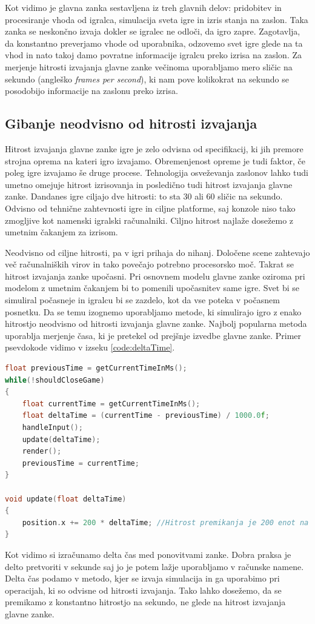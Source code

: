\documentclass[12pt,a4paper,twoside]{book}
\begin{document}
Kot vidimo je glavna zanka sestavljena iz treh glavnih delov: pridobitev in procesiranje vhoda od igralca, simulacija sveta igre in izris stanja na zaslon. Taka zanka se neskončno izvaja dokler se igralec ne odloči, da igro zapre. Zagotavlja, da konstantno preverjamo vhode od uporabnika, odzovemo svet igre glede na ta vhod in nato takoj damo povratne informacije igralcu preko izrisa na zaslon. Za merjenje hitrosti izvajanja glavne zanke večinoma uporabljamo mero sličic na sekundo (angleško \textit{frames per second}), ki nam pove kolikokrat na sekundo se posodobijo informacije na zaslonu preko izrisa.

\subsection{Gibanje neodvisno od hitrosti izvajanja}
Hitrost izvajanja glavne zanke igre je zelo odvisna od specifikacij, ki jih premore strojna oprema na kateri igro izvajamo. Obremenjenost opreme je tudi faktor, če poleg igre izvajamo še druge procese. Tehnologija osveževanja zaslonov lahko tudi umetno omejuje hitrost izrisovanja in posledično tudi hitrost izvajanja glavne zanke. Dandanes igre ciljajo dve hitrosti: to sta 30 ali 60 sličic na sekundo. Odvisno od tehnične zahtevnosti igre in ciljne platforme, saj konzole niso tako zmogljive kot namenski igralski računalniki. Ciljno hitrost najlaže dosežemo z umetnim čakanjem za izrisom. 

Neodvisno od ciljne hitrosti, pa v igri prihaja do nihanj. Določene scene zahtevajo več računalniških virov in tako povečajo potrebno procesorsko moč. Takrat se hitrost izvajanja zanke upočasni. Pri osnovnem modelu glavne zanke oziroma pri modelom z umetnim čakanjem bi to pomenili upočasnitev same igre. Svet bi se simuliral počasneje in igralcu bi se zazdelo, kot da vse poteka v počasnem posnetku. Da se temu izognemo uporabljamo metode, ki simulirajo igro z enako hitrostjo neodvisno od hitrosti izvajanja glavne zanke. Najbolj popularna metoda uporablja merjenje časa, ki je pretekel od prejšnje izvedbe glavne zanke. Primer psevdokode vidimo v izseku \ref{code:deltaTime}.

\begin{lstlisting}[label=code:deltaTime, language=C++, caption=Neodvisno gibanje]
float previousTime = getCurrentTimeInMs();
while(!shouldCloseGame)
{
	float currentTime = getCurrentTimeInMs();
	float deltaTime = (currentTime - previousTime) / 1000.0f;
	handleInput();
	update(deltaTime);
	render();
	previousTime = currentTime;
}

void update(float deltaTime)
{
	position.x += 200 * deltaTime; //Hitrost premikanja je 200 enot na sekundo
}
\end{lstlisting}
Kot vidimo si izračunamo delta čas med ponovitvami zanke. Dobra praksa je delto pretvoriti v sekunde saj jo je potem lažje uporabljamo v računske namene. Delta čas podamo v metodo, kjer se izvaja simulacija in ga uporabimo pri operacijah, ki so odvisne od hitrosti izvajanja. Tako lahko dosežemo, da se premikamo z konstantno hitrostjo na sekundo, ne glede na hitrost izvajanja glavne zanke.
\end{document}

